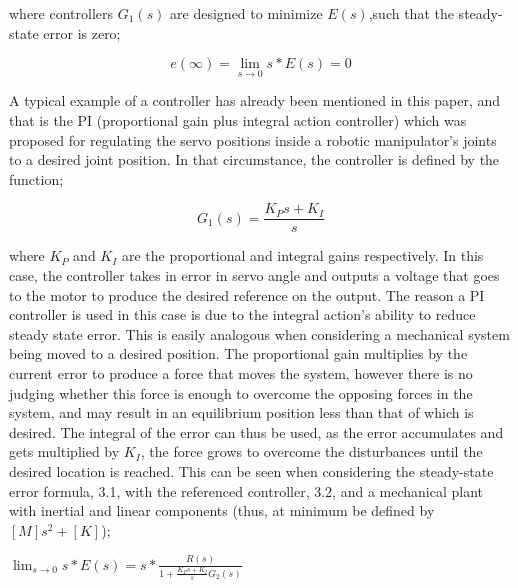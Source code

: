 \documentclass[12pt,openany,a4paper]{book}
\begin{document}
\vspace{\baselineskip}
where controllers $G_1(s)$ are designed to minimize $E(s)$,such that the steady-state error is zero;

\vspace{\baselineskip}
\begin{equation}
e(\infty) = \lim_{s\to0} s * E(s) = 0
\end{equation}

\vspace{\baselineskip}
A typical example of a controller has already been mentioned in this paper, and that is the PI (proportional gain plus integral action controller) which was proposed for regulating the servo positions inside a robotic manipulator's joints to a desired joint position. In that circumstance, the controller is defined by the function;

\vspace{\baselineskip}
\begin{equation}
G_1 (s) = \frac{K_P s + K_I}{s}
\end{equation}

\vspace{\baselineskip}
where $K_P$ and $K_I$ are the proportional and integral gains respectively. In this case, the controller takes in error in servo angle and outputs a voltage that goes to the motor to produce the desired reference on the output. The reason a PI controller is used in this case is due to the integral action's ability to reduce steady state error. This is easily analogous when considering a mechanical system being moved to a desired position. The proportional gain multiplies by the current error to produce a force that moves the system, however there is no judging whether this force is enough to overcome the opposing forces in the system, and may result in an equilibrium position less than that of which is desired. The integral of the error can thus be used, as the error accumulates and gets multiplied by $K_I$, the force grows to overcome the disturbances until the desired location is reached. This can be seen when considering the steady-state error formula, 3.1, with the referenced controller, 3.2, and a mechanical plant with inertial and linear components (thus, at minimum be defined by $[M]s^2 + [K]$);

\vspace{\baselineskip}
\begin{center}
$ \lim_{s\to0} s * E(s) = s * \frac{R(s)}{1 + \frac{K_P s + K_I}{s} G_2(s)}$
\end{center}
\end{document}
